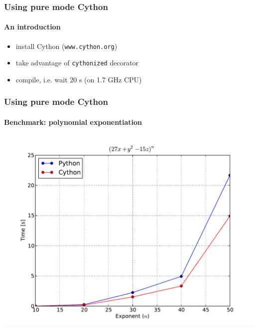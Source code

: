 \documentclass{beamer}
\begin{document}
\begin{frame}
    \frametitle{Using pure mode Cython}
    \framesubtitle{An introduction}

    \begin{itemize}
        \item install Cython (\texttt{www.cython.org})
        \item take advantage of \texttt{cythonized} decorator
        \item compile, i.e. wait 20 s (on 1.7 GHz CPU)
    \end{itemize}
\end{frame}

\begin{frame}
    \frametitle{Using pure mode Cython}
    \framesubtitle{Benchmark: polynomial exponentiation}

    \begin{center}
        \includegraphics[scale=0.45]{images/cython-power.pdf}
    \end{center}
\end{frame}
\end{document}
